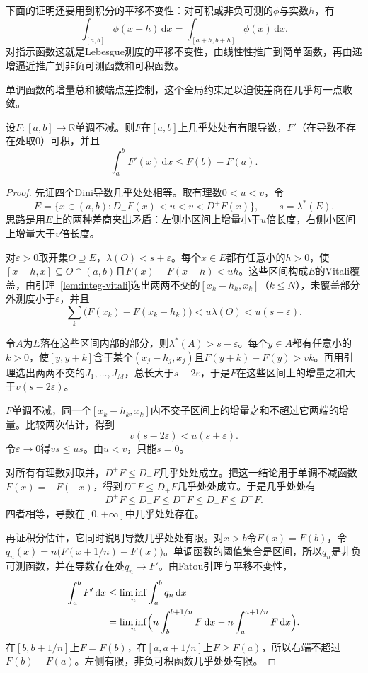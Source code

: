 下面的证明还要用到积分的平移不变性：对可积或非负可测的$\phi$与实数$h$，有
\[
 \int_{[a,b]}\phi(x+h)\,\mathrm dx=\int_{[a+h,b+h]}\phi(x)\,\mathrm dx .
\]
对指示函数这就是Lebesgue测度的平移不变性，由线性性推广到简单函数，再由递增逼近推广到非负可测函数和可积函数。

单调函数的增量总和被端点差控制，这个全局约束足以迫使差商在几乎每一点收敛。

\begin{theorem}[单调函数几乎处处可导]
\label{thm:integ-monotone-differentiable}
设$F:[a,b]\to\mathbb R$单调不减。则$F$在$[a,b]$上几乎处处有有限导数，$F'$（在导数不存在处取$0$）可积，并且
\begin{equation}
 \int_a^bF'(x)\,\mathrm dx\leq F(b)-F(a).
 \label{eq:integ-monotone-derivative-bound}
\end{equation}
\end{theorem}

\begin{proof}
先证四个Dini导数几乎处处相等。取有理数$0<u<v$，令
\[
 E=\{x\in(a,b):D_-F(x)<u<v<D^+F(x)\},\qquad s=\lambda^*(E).
\]
思路是用$E$上的两种差商夹出矛盾：左侧小区间上增量小于$u$倍长度，右侧小区间上增量大于$v$倍长度。

对$\varepsilon>0$取开集$O\supseteq E$，$\lambda(O)<s+\varepsilon$。每个$x\in E$都有任意小的$h>0$，使$[x-h,x]\subseteq O\cap(a,b)$且$F(x)-F(x-h)<uh$。这些区间构成$E$的Vitali覆盖，由引理~\ref{lem:integ-vitali}选出两两不交的$[x_k-h_k,x_k]$（$k\leq N$），未覆盖部分外测度小于$\varepsilon$，并且
\[
 \sum_k\bigl(F(x_k)-F(x_k-h_k)\bigr)<u\lambda(O)<u(s+\varepsilon).
\]

令$A$为$E$落在这些区间内部的部分，则$\lambda^*(A)>s-\varepsilon$。每个$y\in A$都有任意小的$k>0$，使$[y,y+k]$含于某个$(x_j-h_j,x_j)$且$F(y+k)-F(y)>vk$。再用引理选出两两不交的$J_1,\dots,J_M$，总长大于$s-2\varepsilon$，于是$F$在这些区间上的增量之和大于$v(s-2\varepsilon)$。

$F$单调不减，同一个$[x_k-h_k,x_k]$内不交子区间上的增量之和不超过它两端的增量。比较两次估计，得到
\[
 v(s-2\varepsilon)<u(s+\varepsilon).
\]
令$\varepsilon\to0$得$vs\leq us$。由$u<v$，只能$s=0$。

对所有有理数对取并，$D^+F\leq D_-F$几乎处处成立。把这一结论用于单调不减函数$\tilde F(x)=-F(-x)$，得到$D^-F\leq D_+F$几乎处处成立。于是几乎处处有
\[
 D^+F\leq D_-F\leq D^-F\leq D_+F\leq D^+F .
\]
四者相等，导数在$[0,+\infty]$中几乎处处存在。

再证积分估计，它同时说明导数几乎处处有限。对$x>b$令$F(x)=F(b)$，令$q_n(x)=n\bigl(F(x+1/n)-F(x)\bigr)$。单调函数的阈值集合是区间，所以$q_n$是非负可测函数，并在导数存在处$q_n\to F'$。由Fatou引理与平移不变性，
\[
\begin{aligned}
 \int_a^bF'\,\mathrm dx&\leq\liminf_n\int_a^bq_n\,\mathrm dx\\
 &=\liminf_n\Bigl(n\int_b^{b+1/n}F\,\mathrm dx-n\int_a^{a+1/n}F\,\mathrm dx\Bigr).
\end{aligned}
\]
在$[b,b+1/n]$上$F=F(b)$，在$[a,a+1/n]$上$F\geq F(a)$，所以右端不超过$F(b)-F(a)$。左侧有限，非负可积函数几乎处处有限。
\end{proof}

